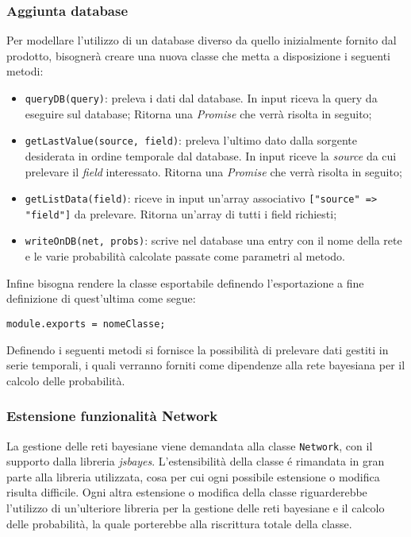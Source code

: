 \subsubsection{Aggiunta database}
Per modellare l'utilizzo di un database diverso da quello inizialmente fornito dal prodotto, bisognerà creare una nuova classe che metta a disposizione i seguenti metodi: 
\begin{itemize}
 \item \texttt{queryDB(query)}: preleva i dati dal database. In input riceva la query da eseguire sul database;
 Ritorna una \textit{Promise} che verrà risolta in seguito;
 \item \texttt{getLastValue(source, field)}: preleva l'ultimo dato dalla sorgente desiderata in ordine temporale dal database. In input riceve la \textit{source} da cui prelevare il \textit{field} interessato. Ritorna una \textit{Promise} che verrà risolta in seguito;
 \item \texttt{getListData(field)}: riceve in input un'array associativo \texttt{["source" => "field"]} da prelevare. 
 Ritorna un'array di tutti i field richiesti;
 \item \texttt{writeOnDB(net, probs)}: scrive nel database una entry con il nome della rete e le varie probabilità calcolate passate come parametri al metodo.
\end{itemize}
Infine bisogna rendere la classe esportabile definendo l'esportazione a fine definizione di quest'ultima come segue: 
\begin{center}
 \texttt{module.exports = nomeClasse;}
\end{center}
Definendo i seguenti metodi si fornisce la possibilità di prelevare dati gestiti in serie temporali, i quali verranno forniti come dipendenze alla rete bayesiana per il calcolo delle probabilità. 

\subsubsection{Estensione funzionalità Network}
La gestione delle reti bayesiane viene  demandata alla classe \texttt{Network}, con il supporto dalla libreria \textit{jsbayes}. L'estensibilità della classe é rimandata in gran parte alla libreria utilizzata, cosa per cui ogni possibile estensione o modifica risulta difficile. Ogni altra estensione o modifica della classe riguarderebbe l'utilizzo di un'ulteriore libreria per la gestione delle reti bayesiane e il calcolo delle probabilità, la quale porterebbe alla riscrittura totale della classe. 


